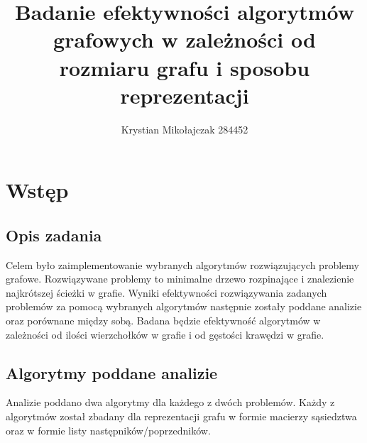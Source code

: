 \documentclass{article}
\title{Badanie efektywności algorytmów grafowych w zależności od rozmiaru grafu i sposobu reprezentacji}
\author{Krystian Mikołajczak 284452}
\theoremstyle{mytheoremstyle}
\theoremstyle{mytheoremstyle}
\theoremstyle{myproblemstyle}
\begin{document}
    \maketitle
    \section{Wstęp}
    \subsection{Opis zadania}
      Celem było zaimplementowanie wybranych algorytmów rozwiązujących problemy grafowe. Rozwiązywane problemy to minimalne drzewo rozpinające i znalezienie najkrótszej ścieżki w grafie.
      Wyniki efektywności rozwiązywania zadanych problemów za pomocą wybranych algorytmów następnie zostały poddane analizie oraz porównane między sobą. Badana będzie efektywność algorytmów w zależności 
      od ilości wierzchołków w grafie i od gęstości krawędzi w grafie.
    \subsection{Algorytmy poddane analizie}
      Analizie poddano dwa algorytmy dla każdego z dwóch problemów. Każdy z algorytmów został zbadany dla reprezentacji grafu w formie macierzy sąsiedztwa oraz w formie listy następników/poprzedników.  
\end{document}
